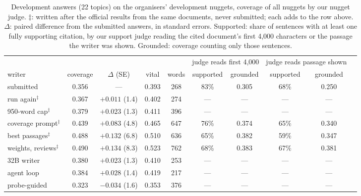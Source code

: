 \documentclass[sigconf,nonacm]{acmart}
\begin{document}
\begin{table}[t]
\caption{Development answers (22 topics) on the organisers' development nuggets,
coverage of all nuggets by our nugget judge. $\ddagger$: written after the official
results from the same documents, never submitted; each adds to the row above.
$\Delta$: paired difference from the submitted answers, in standard errors.
Supported: share of sentences with at least one fully supporting citation, by our
support judge reading the cited document's first 4,000 characters or the passage the
writer was shown. Grounded: coverage counting only those sentences.}
\label{tab:rerun}
\small
\begin{tabular}{lccccccccc}
\toprule
 & & & & & \multicolumn{2}{c}{judge reads first 4,000} & \multicolumn{2}{c}{judge reads passage shown} \\
\cmidrule(lr){6-7}\cmidrule(lr){8-9}
writer & coverage & $\Delta$ (SE) & vital & words & supported & grounded & supported & grounded \\
\midrule
submitted & 0.356 & --- & 0.393 & 268 & 83\% & 0.305 & 68\% & 0.250 \\
run again$^\ddagger$ & 0.367 & $+0.011$ (1.4) & 0.402 & 274 & --- & --- & --- & --- \\
950-word cap$^\ddagger$ & 0.379 & $+0.023$ (1.3) & 0.411 & 396 & --- & --- & --- & --- \\
coverage prompt$^\ddagger$ & 0.439 & $+0.083$ (4.8) & 0.465 & 647 & 76\% & 0.374 & 65\% & 0.340 \\
best passages$^\ddagger$ & 0.488 & $+0.132$ (6.8) & 0.510 & 636 & 65\% & 0.382 & 59\% & 0.347 \\
weights, reviews$^\ddagger$ & 0.490 & $+0.134$ (8.3) & 0.523 & 762 & 68\% & 0.383 & 67\% & 0.381 \\
\midrule
32B writer & 0.380 & $+0.023$ (1.3) & 0.410 & 253 & --- & --- & --- & --- \\
agent loop & 0.384 & $+0.028$ (1.4) & 0.419 & 217 & --- & --- & --- & --- \\
probe-guided & 0.323 & $-0.034$ (1.6) & 0.353 & 376 & --- & --- & --- & --- \\
\bottomrule
\end{tabular}
\end{table}
\end{document}
